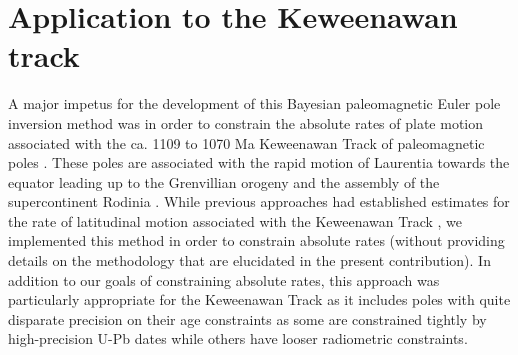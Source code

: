 \documentclass[11pt,letterpaper]{article}
\begin{document}
\section*{Application to the Keweenawan track}
\label{sec:keweenawan}
A major impetus for the development of this Bayesian paleomagnetic Euler pole inversion method was in order to constrain the absolute rates of plate motion associated with the ca. 1109 to 1070 Ma Keweenawan Track of paleomagnetic poles \citep{Swanson-Hysell2019a}. These poles are associated with the rapid motion of Laurentia towards the equator leading up to the Grenvillian orogeny and the assembly of the supercontinent Rodinia \citep{Swanson-Hysell2021a}. While previous approaches had established estimates for the rate of latitudinal motion associated with the Keweenawan Track \citep{Davis1997a, Swanson-Hysell2014b}, we implemented this method in order to constrain absolute rates (without providing details on the methodology that are elucidated in the present contribution). In addition to our goals of constraining absolute rates, this approach was particularly appropriate for the Keweenawan Track as it includes poles with quite disparate precision on their age constraints as some are constrained tightly by high-precision U-Pb dates \citep[e.g.]{Fairchild2017a} while others have looser radiometric constraints. 




\end{document}
